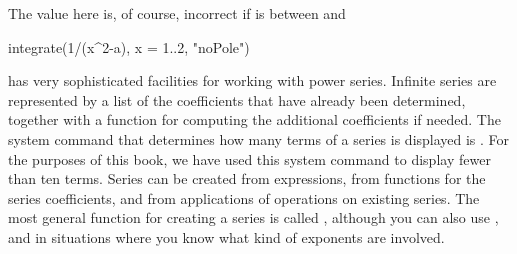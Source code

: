 {{{{{{{{{{{{{{%
\begin{xtc}
\begin{xtccomment}
The value here is, of course, incorrect if  is between
 and 
\end{xtccomment}
\begin{spadsrc}
integrate(1/(x^2-a), x = 1..2, "noPole")
\end{spadsrc}
\begin{TeXOutput}
\begin{fricasmath}{10}
%
\end{fricasmath}
\end{TeXOutput}
\end{xtc}

%
\Language{} has very sophisticated facilities for working with power
series.
Infinite series are represented by a list of the
coefficients that have already been determined, together with a
function for computing the additional coefficients if needed.
%
The system command that determines how many terms of a series is displayed
is .
For the purposes of this book, we have used this system command to display
fewer than ten terms.
Series can be created from expressions, from functions for the
series coefficients, and from applications of operations on
existing series.
The most general function for creating a series is called
, although you can also use ,
 and  in situations where you
know what kind of exponents are involved.

}}}}}}}}}}}}}}
